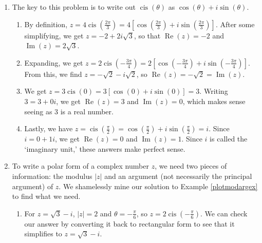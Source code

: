 {
\begin{enumerate}


\item The key to this problem is to write out $\operatorname{cis}(\theta)$ as $\cos(\theta) + i\sin(\theta)$.

\begin{enumerate}

\item By definition, $z =4 \operatorname{cis}\left(\frac{2\pi}{3}\right) = 4\left[\cos\left(\frac{2\pi}{3}\right) + i \sin\left(\frac{2\pi}{3}\right)\right]$. After some simplifying, we get $z = -2 + 2i\sqrt{3}$, so that $\operatorname{Re}(z) = -2$ and $\operatorname{Im}(z) = 2\sqrt{3}$.

\item Expanding, we get $z = 2 \operatorname{cis}\left(-\frac{3\pi}{4}\right) = 2\left[\cos\left(-\frac{3\pi}{4}\right) + i \sin\left(-\frac{3\pi}{4}\right)\right]$. From this, we find $z= -\sqrt{2} - i\sqrt{2}$, so $\operatorname{Re}(z) = -\sqrt{2} = \operatorname{Im}(z)$.

\item  We get  $z = 3 \operatorname{cis}(0) = 3\left[\cos(0) + i\sin(0)\right] = 3$.  Writing $3 = 3 + 0i$, we get $\operatorname{Re}(z) = 3$ and $\operatorname{Im}(z) = 0$, which makes sense seeing as $3$ is a real number.

\item  Lastly, we have  $z = \operatorname{cis}\left(\frac{\pi}{2}\right) = \cos\left(\frac{\pi}{2}\right)+ i\sin\left(\frac{\pi}{2}\right) = i$.  Since $i = 0 + 1i$, we get $\operatorname{Re}(z) = 0$ and $\operatorname{Im}(z) = 1$.  Since $i$ is called the `imaginary unit,'  these answers make perfect sense.

\end{enumerate}

\item  To write a polar form of a complex number $z$, we need two pieces of information:  the modulus $|z|$ and an argument (not necessarily the principal argument) of $z$.   We shamelessly mine our solution to  Example \ref{plotmodargex} to find what we need.

\begin{enumerate}

\item  For $z = \sqrt{3}-i$, $|z| = 2$ and $\theta = -\frac{\pi}{6}$, so $z = 2 \operatorname{cis}\left(-\frac{\pi}{6}\right)$.  We can check our answer by converting it back to rectangular form to see that it simplifies to $z = \sqrt{3} - i$.


\end{enumerate}
\end{enumerate}}
